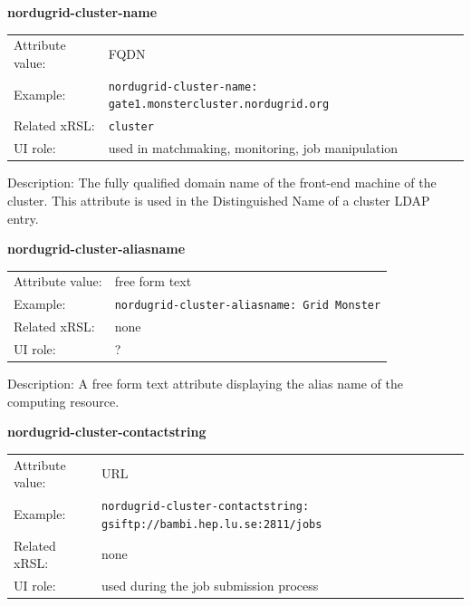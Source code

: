 \documentclass{article}
\begin{document}
  \hspace*{0.5cm}
  \begin{shaded}
    \textbf{nordugrid-cluster-name}
  \end{shaded}
  \begin{tabular}{lp{10cm}}  
    Attribute value:& FQDN\\
    Example:&  \verb#nordugrid-cluster-name: gate1.monstercluster.nordugrid.org#\\
    Related xRSL:& \verb#cluster#\\
    UI role:& used in matchmaking, monitoring, job manipulation \\
    
  \end{tabular}

Description: The fully qualified domain name of the front-end machine of the 
cluster. This attribute is used in the Distinguished Name of a cluster LDAP entry.


  \hspace*{0.5cm}
  \begin{shaded}
    \textbf{nordugrid-cluster-aliasname}
  \end{shaded}
  \begin{tabular}{lp{10cm}}  
    Attribute value:& free form text\\
    Example:& \verb#nordugrid-cluster-aliasname: Grid Monster#\\
    Related xRSL:& none\\
    UI role:& ?\\
  \end{tabular}

Description: A free form text attribute displaying the alias name of the computing resource.


  \hspace*{0.5cm}
  \begin{shaded}
    \textbf{nordugrid-cluster-contactstring}
  \end{shaded}
  \begin{tabular}{lp{10cm}}  
    Attribute value:& URL\\
    Example:& \verb#nordugrid-cluster-contactstring: gsiftp://bambi.hep.lu.se:2811/jobs#\\
    Related xRSL:& none\\    
    UI role:& used during the job submission process\\
  \end{tabular}
\end{document}
